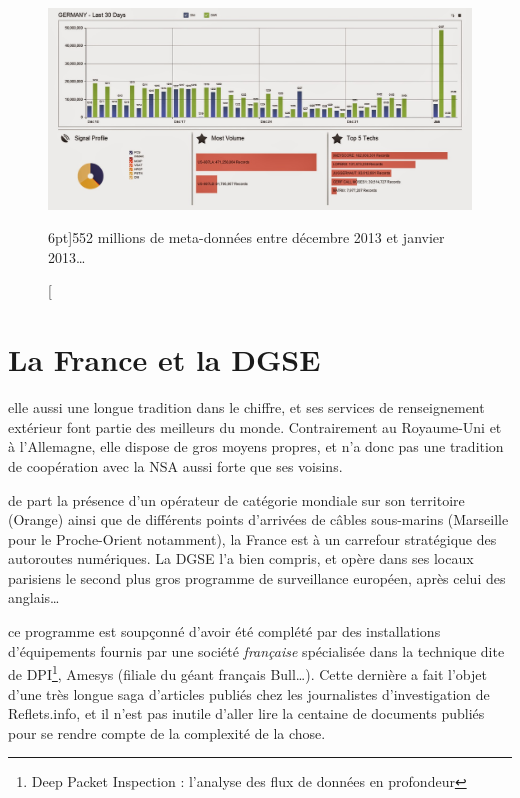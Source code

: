\begin{figure}
\includegraphics{ba3.jpg}
\caption[Capture écran de BOUNDLESSINFORMANT pour l'Allemagne][6pt]{552 millions
de meta-données entre décembre 2013 et janvier 2013\ldots}
\label{fig:ba3}
\end{figure}

\newpage
\section{La France et la DGSE}

 elle aussi une longue tradition dans le chiffre, et ses
services de renseignement extérieur font partie des meilleurs du monde.
Contrairement au Royaume-Uni et à l'Allemagne, elle dispose de gros moyens
propres, et n'a donc pas une tradition de coopération avec la NSA aussi forte
que ses voisins. 

 de part la présence d'un opérateur de catégorie mondiale
sur son territoire (Orange) ainsi que de différents points d'arrivées de câbles
sous-marins (Marseille pour le Proche-Orient notamment), la France est à un
carrefour stratégique des autoroutes numériques. La DGSE l'a bien compris, et
opère dans ses locaux parisiens le second plus gros programme de surveillance
européen, après celui des anglais\ldots\autocite{DGSE}

 ce programme est soupçonné d'avoir été
complété par des installations\autocite{reflets} d'équipements fournis par une
société \emph{française} spécialisée dans la technique dite de DPI\footnote{Deep
Packet Inspection :
l'analyse des flux de données en profondeur}, Amesys (filiale du géant français
Bull\ldots).
Cette dernière a fait l'objet d'une très longue saga d'articles publiés chez les journalistes d'investigation de
Reflets.info, et il n'est pas inutile d'aller lire la centaine de documents
publiés pour se rendre compte de la complexité de la chose.

